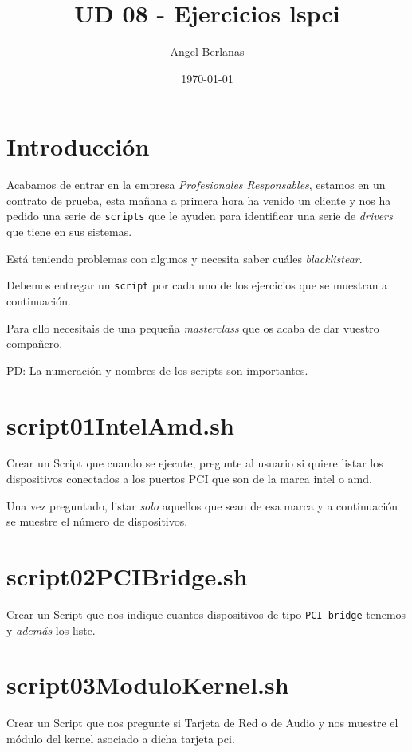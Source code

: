 \documentclass[11pt]{article}
\author{Angel Berlanas}
\date{\today}
\title{UD 08 - Ejercicios lspci}
\begin{document}
\maketitle
\tableofcontents


\section{Introducción}
\label{sec:org6c5e7ea}

Acabamos de entrar en la empresa \emph{Profesionales Responsables}, estamos en un
contrato de prueba, esta mañana a primera hora ha venido un cliente y nos ha
pedido una serie de \texttt{scripts} que le ayuden para identificar una serie de
\emph{drivers} que tiene en sus sistemas.

Está teniendo problemas con algunos y necesita saber cuáles \emph{blacklistear}.

Debemos entregar un \texttt{script} por cada uno de los ejercicios que se muestran a
continuación.

Para ello necesitais de una pequeña \emph{masterclass} que os acaba de dar vuestro
compañero. 

PD: La numeración y nombres de los scripts son importantes.

\section{script01IntelAmd.sh}
\label{sec:orgc22d52b}

Crear un Script que cuando se ejecute, pregunte al usuario si quiere listar
los dispositivos conectados a los puertos PCI que son de la marca intel o amd.

Una vez preguntado, listar \emph{solo} aquellos que sean de esa marca y a
continuación se muestre el número de dispositivos.

\section{script02PCIBridge.sh}
\label{sec:org0715e74}

Crear un Script que nos indique cuantos dispositivos de tipo \texttt{PCI bridge} tenemos y
\emph{además} los liste.

\section{script03ModuloKernel.sh}
\label{sec:org33831ae}

Crear un Script que nos pregunte si Tarjeta de Red o de Audio y nos muestre el
módulo del kernel asociado a dicha tarjeta pci.
\end{document}
